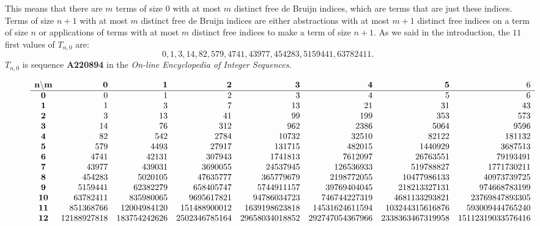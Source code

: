 \documentclass{jfp1}
\begin{document}
This means that there are $m$ terms of size $0$ with at most $m$ distinct free de Bruijn indices, which are terms
that are just these indices.   Terms of size $n+1$ with at most $m$ distinct free de
Bruijn indices are either abstractions with at most $m+1$ distinct free indices on a term of size
$n$ or applications of terms with at most $m$ distinct free indices to make a term of size $n+1$.  As we said in the introduction, the $11$ first values of $T_{n,0}$ are:
\[0, 1, 3, 14, 82, 579, 4741, 43977, 454283, 5159441, 63782411.\] $T_{n,0}$ is sequence \textbf{A220894} in the \emph{On-line Encyclopedia of Integer Sequences}.
\begin{figure*}
  \centering
  \begin{tiny}
    \begin{math}
\begin{array}[c]{ c r  r  r  r  r  r  r }
\mathit{\mathbf{n\backslash m}} & \mathbf{0} & \mathbf{1} & \mathbf{2} & \mathbf{3} & \mathbf{4} & \mathbf{5} & 6  \\
        \hline \mathbf{0} &  0 & 1 & 2 & 3 & 4 & 5 & 6   \\
\mathbf{1}&1 & 3 & 7 & 13 & 21 & 31 & 43  \\
\mathbf{2}&3 & 13 & 41 & 99 & 199 & 353 & 573 \\
\mathbf{3}&14 & 76 & 312 & 962 & 2386 & 5064 & 9596  \\
\mathbf{4}&82 & 542 & 2784 & 10732 & 32510 & 82122 & 181132 \\
\mathbf{5}&579 & 4493 & 27917 & 131715 & 482015 & 1440929 & 3687513 \\
\mathbf{6}&4741 & 42131 & 307943 & 1741813 & 7612097 & 26763551 & 79193491 \\
\mathbf{7}&43977 & 439031 & 3690055 & 24537945 & 126536933 & 519788827 & 1771730211 \\
\mathbf{8}&454283 & 5020105 & 47635777 & 365779679 & 2198772055 & 10477986133 &
        40973739725 \\
\mathbf{9}&5159441 & 62382279 & 658405747 & 5744911157 & 39769404045 & 218213327131 &
        974668783199 \\
\mathbf{10}&63782411 & 835980065 & 9695617821 & 94786034723 & 746744227319 &
        4681133293821 & 23769847893305 \\
\mathbf{11}&851368766 & 12004984120 & 151488900012 & 1639198623818 & 14531624611594 &
        103244315616876 & 593009444765240 \\
\mathbf{12} &12188927818 & 183754242626 & 2502346785164 & 29658034018852 &
        292747054367966 & 2338363467319958 & 15112319033576416 \\

\end{array}
\end{math}
\end{tiny}
\end{figure*}
\end{document}
